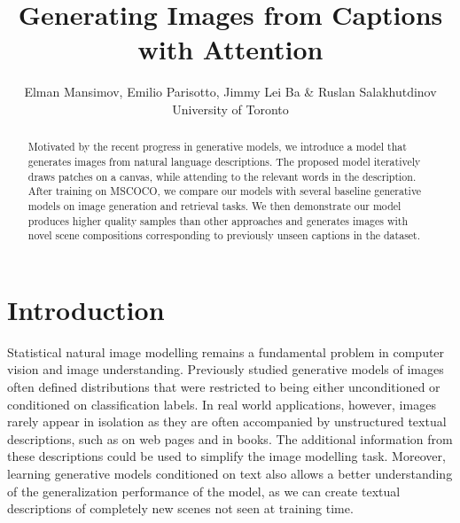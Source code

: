 \documentclass{article} %
\title{Generating Images from Captions with Attention}
\author{
Elman Mansimov, Emilio Parisotto, Jimmy Lei Ba \& Ruslan Salakhutdinov\\
University of Toronto\\
}
\newcommand{\comm}[1]{}
\begin{document}
\maketitle
\vspace*{-0.4cm}
\begin{abstract}
\vspace*{-0.15cm}
Motivated by the recent progress in generative models, we introduce a model that generates images from natural language descriptions. The proposed model iteratively draws patches on a canvas, while attending to the relevant words in the description. After training on MSCOCO, we compare our models with several baseline generative models on image generation and retrieval tasks. We then demonstrate our model produces higher quality samples than other approaches and generates images with novel scene compositions corresponding to previously unseen captions in the dataset.   
\end{abstract} 

\vspace{-0.1in}
\section{Introduction}
Statistical natural image modelling remains a fundamental problem in computer vision and image understanding.
Previously studied generative models of images often defined distributions that were restricted to being either unconditioned or conditioned on classification labels. In real world applications, however, images rarely appear in isolation as they are often accompanied by unstructured textual descriptions, such as on web pages and in books. 
The additional information from these descriptions could be used to simplify the image modelling task. Moreover, learning generative models conditioned on text also allows a better understanding of the generalization performance of the model, as we can create textual descriptions of completely new scenes not seen at training time. 

\comm{
Significant amount of recent works has been focused on generating captions from images \citep{karpathy_captions}, \citep{xu_captions}, \citep{kiros_captions} and etc. By contrast, image understanding may also be studied by generating images correctly interpreting the text description. 
Generating high dimensional realistic images from their descriptions is a more difficult approach that combines two challenging components of language modelling and image generation.  
}
\end{document}
